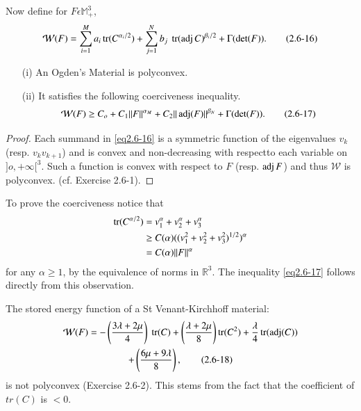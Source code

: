 Now define for $F \epsilon \mathbb{M}^3_+$,
\begin{equation*}
\mathcal{W}(F)= \sum^{M}_{i=1} a_i \operatorname{tr} 
(C^{\alpha_i/2})+\sum^{N}_{j=1}b_j ~\operatorname{tr}  (\operatorname{adj}
C)^{\beta_i/2}+\Gamma(\det (F)). \tag{2.6-16} \label{eq2.6-16}
\end{equation*}

\begin{theorem}\label{chap2-thm2.6.1}%
\begin{itemize}
\item[(i)] An Ogden's Material is polyconvex.
\item[(ii)] It satisfies the following coerciveness inequality.
  \begin{equation*}
    \mathcal{W}(F) \ge C_o +C_1 ||F||^{\alpha_M}+C_2|| \operatorname{adj}
    (F)||^{\beta_N}+\Gamma (\det (F)). \tag{2.6-17}\label{eq2.6-17} 
  \end{equation*}
  \end{itemize}
\end{theorem}

\begin{proof}
Each summand in \eqref{eq2.6-16} is a symmetric function of the eigenvalues
$v_k$(resp. $v_k v_{k+1}$) and is convex and non-decreasing with
respect\pageoriginale to each variable on $]o, +\infty[^3$. Such a function is
    convex with respect to $F$ (resp. $\operatorname{adj}  F$) and thus
    $\mathcal{W}$ is polyconvex. (cf. Exercise 2.6-1). 
\end{proof}

To prove the coerciveness notice that
\begin{align*}
  \operatorname{tr} (C^{\alpha/2}) &=v^\alpha_1 +v^\alpha_2 +v^\alpha_3 \\
  & \ge C(\alpha)((v^2_1 +v^2_2 +v^2_3)^{1/2})^\alpha \\
  & = C(\alpha)||F||^\alpha
\end{align*}
for any $\alpha \ge 1$, by the equivalence of norms in
$\mathbb{R}^3$. The inequality \eqref{eq2.6-17} follows directly from this
observation. 

The stored energy function of a St Venant-Kirchhoff  material:
\begin{multline*}
\mathcal{W}(F)=-\left(\frac{3 \lambda +2 \mu}{4}\right) ~\operatorname{tr}
(C)+\left(\frac{\lambda +2 \mu}{8}\right) \operatorname{tr} (C^2)+\frac{\lambda}{4}
\operatorname{tr} (\operatorname{adj}  (C))\\ 
  +\left(\frac{6 \mu + 9\lambda}{8}\right), \tag{2.6-18} \label{eq2.6-18}
\end{multline*}
is not polyconvex (Exercise 2.6-2). This stems from the fact that
the coefficient of $tr(C)$ is $< 0$. 

